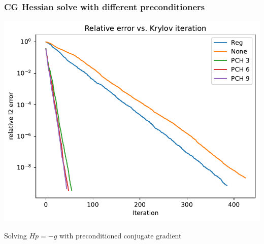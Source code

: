\documentclass[10pt,final,xcolor=dvipsnames]{beamer}
\begin{document}

\begin{frame}
	\frametitle{CG Hessian solve with different preconditioners}
	\begin{center}
		\includegraphics[width=0.75\columnwidth]{error_vs_krylov_iter.pdf}
	\end{center}
Solving $Hp=-g$ with preconditioned conjugate gradient
\end{frame}
\end{document}
